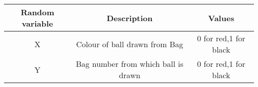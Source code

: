 \begin{tabular}{|c|c|c|}             
\hline
Random variable	&       Description	 &          Values\\
\hline 
               X	&Colour of ball drawn from Bag &        0 for red,1 for black\\
\hline           
               Y	&Bag number from which ball is drawn	&        0 for red,1 for black\\
\hline 
\end{tabular}

